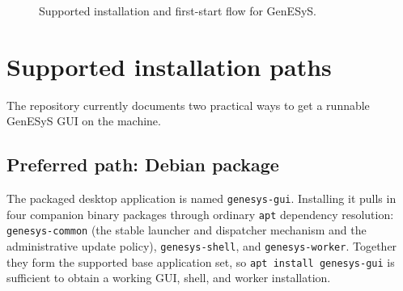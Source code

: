 \begin{figure}[htbp]
    \centering



    \caption{Supported installation and first-start flow for GenESyS.}
    \label{fig:user-installation-flow}
\end{figure}

\section{Supported installation paths}
\label{sec:user-installation-supported-paths}

The repository currently documents two practical ways to get a runnable
GenESyS GUI on the machine.

\subsection{Preferred path: Debian package}
\label{subsec:user-installation-debian-package}

The packaged desktop application is named \texttt{genesys-gui}. Installing it
pulls in four companion binary packages through ordinary \texttt{apt}
dependency resolution: \texttt{genesys-common} (the stable launcher and
dispatcher mechanism and the administrative update policy),
\texttt{genesys-shell}, and \texttt{genesys-worker}. Together they form the
supported base application set, so \texttt{apt install genesys-gui} is
sufficient to obtain a working GUI, shell, and worker installation.

